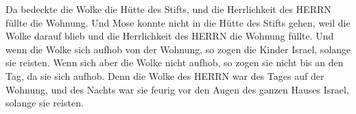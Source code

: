  Da bedeckte die Wolke die Hütte des Stifts, und die
Herrlichkeit des HERRN füllte die Wohnung.  Und Mose konnte
nicht in die Hütte des Stifts gehen, weil die Wolke darauf blieb und die
Herrlichkeit des HERRN die Wohnung füllte.  Und wenn die
Wolke sich aufhob von der Wohnung, so zogen die Kinder Israel, solange
sie reisten.  Wenn sich aber die Wolke nicht aufhob, so
zogen sie nicht bis an den Tag, da sie sich aufhob.  Denn
die Wolke des HERRN war des Tages auf der Wohnung, und des Nachts war
sie feurig vor den Augen des ganzen Hauses Israel, solange sie reisten.
